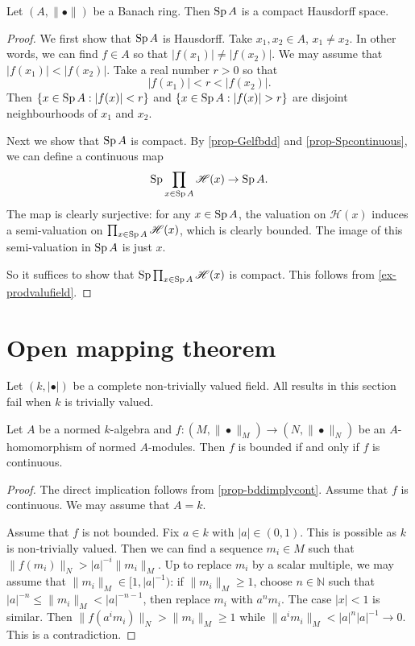 \begin{thm}\label{thm-spectrumcptHaus}
    Let $(A,\|\bullet\|)$ be a Banach ring. Then $\operatorname{Sp} A$ is a compact Hausdorff space.
\end{thm}
\begin{proof}
    We first show that $\operatorname{Sp} A$ is Hausdorff. Take $x_1, x_2\in A$, $x_1\neq x_2$. In other words, we can find $f\in A$ so that $|f(x_1)|\neq |f(x_2)|$. We may assume that     $|f(x_1)|< |f(x_2)|$. Take a real number $r>0$ so that
    \[
        |f(x_1)|< r <|f(x_2)|.
    \]
    Then $\{x\in \operatorname{Sp} A: |f(x)|<r\}$ and $\{x\in \Sp A: |f(x)|>r\}$ are disjoint neighbourhoods of $x_1$ and $x_2$.

    Next we show that $\operatorname{Sp} A$ is compact. By \cref{prop-Gelfbdd} and \cref{prop-Spcontinuous}, we can define a continuous map
    \[
        \operatorname{Sp} \prod_{x\in \operatorname{Sp} A}\mathscr{H}(x)\rightarrow \operatorname{Sp} A.  
    \]
    The map is clearly surjective: for any $x\in \operatorname{Sp} A$, the valuation on $\mathscr{H}(x)$ induces a semi-valuation on  $\prod_{x\in \operatorname{Sp} A}\mathscr{H}(x)$, which is clearly bounded. The image of this semi-valuation in $\operatorname{Sp} A$ is just $x$.

    So it suffices to show that $\operatorname{Sp} \prod_{x\in \operatorname{Sp} A}\mathscr{H}(x)$ is compact. This follows from \cref{ex-prodvalufield}.
\end{proof}



\section{Open mapping theorem}
Let $(k,|\bullet|)$ be a complete non-trivially valued field. All results in this section fail when $k$ is trivially valued.

\begin{proposition}\label{prop-bddequivcont}
    Let $A$ be a normed $k$-algebra and $f:(M,\|\bullet\|_M)\rightarrow (N,\|\bullet\|_N)$ be an $A$-homomorphism of normed $A$-modules. Then $f$ is bounded if and only if $f$ is continuous. 
\end{proposition}
\begin{proof}
    The direct implication follows from \cref{prop-bddimplycont}. Assume that $f$ is continuous. We may assume that $A=k$. 

    Assume that $f$ is not bounded. Fix $a\in k$ with $|a|\in (0,1)$. This is possible as $k$ is non-trivially valued.
    Then we can find a sequence $m_i\in M$ such that $\|f(m_i)\|_N>|a|^{-i}\|m_i\|_M$. Up to replace $m_i$ by a scalar multiple, we may assume that $\|m_i\|_M\in [1,|a|^{-1})$: if $\|m_i\|_M\geq 1$, choose $n\in \mathbb{N}$ such that $|a|^{-n}\leq \|m_i\|_M<|a|^{-n-1}$, then replace $m_i$ with $a^nm_i$. The case $|x|<1$ is similar. 
    Then $\|f(a^im_i)\|_N>\|m_i\|_M\geq 1$ while $\|a^im_i\|_M<|a|^n |a|^{-1}\to 0$. This is a contradiction.
\end{proof}

